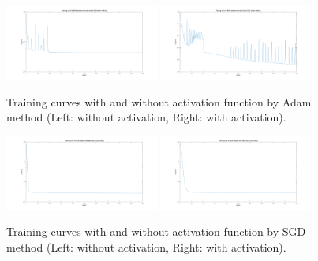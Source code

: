 \begin{figure}[!htbp]
	\centering
	\includegraphics[width=0.45\textwidth]{figures/Darcy_CNN/darcy_loss_2000_adam.png}
	\includegraphics[width=0.45\textwidth]{figures/Darcy_CNN/darcy_loss_2000_adam_nonlinear.png}
	\caption{Training curves  with and without activation function by Adam method (Left: without activation, Right:  with activation).}
\end{figure}

	\begin{figure}[!htbp]
	\centering
	\includegraphics[width=0.45\textwidth]{figures/Darcy_CNN/darcy_loss_2000_SGD.png}
	\includegraphics[width=0.45\textwidth]{figures/Darcy_CNN/darcy_loss_2000_SGD_nonlinear.png}
	\caption{Training curves  with and without activation function by SGD method (Left: without activation, Right:  with activation).}
\end{figure}


